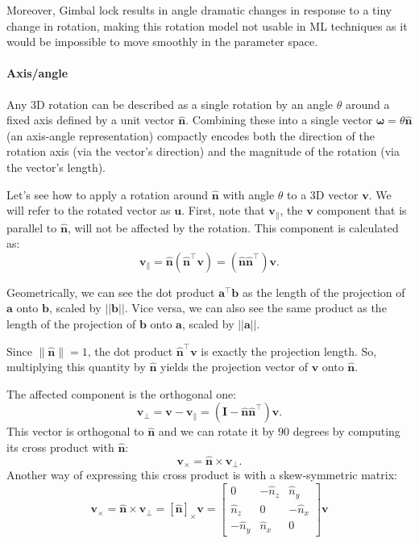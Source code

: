 Moreover, Gimbal lock results in angle dramatic changes in response to a tiny change in rotation, making this rotation model not usable in ML techniques as it would be impossible to move smoothly in the parameter space.

\paragraph{Axis/angle}
Any 3D rotation can be described as a single rotation by an angle $\theta$ around a fixed axis defined by a unit vector $\hat{\mathbf{n}}$.
Combining these into a single vector $\mathbf{\omega} = \theta \hat{\mathbf{n}}$ (an axis-angle representation) compactly encodes both the direction of the rotation axis (via the vector's direction) and the magnitude of the rotation (via the vector's length). 

Let's see how to apply a rotation around $\hat{\mathbf{n}}$ with angle $\theta$ to a 3D vector $\mathbf{v}$.
We will refer to the rotated vector as $\mathbf{u}$.
First, note that $\mathbf{v}_{\parallel}$, the $\mathbf{v}$ component that is parallel to $\hat{\mathbf{n}}$, will not be affected by the rotation.
This component is calculated as:
$$\mathbf{v}_{\parallel}=\hat{\mathbf{n}}(\hat{\mathbf{n}}^{\top}\mathbf{v} )=(\hat{\mathbf{n}}\hat{\mathbf{n}}^{\top})\mathbf{v}.$$

Geometrically, we can see the dot product $\mathbf{a}^{\top}\mathbf{b}$ as the length of the projection of $\mathbf{a}$ onto $\mathbf{b}$, scaled by $||\mathbf{b}||$.
Vice versa, we can also see the same product as the length of the projection of $\mathbf{b}$ onto $\mathbf{a}$, scaled by $||\mathbf{a}||$.

Since $\| \hat{\mathbf{n}} \| =1$, the dot product $\hat{\mathbf{n}}^{\top}\mathbf{v}$ is exactly the projection length.
So, multiplying this quantity by $\hat{\mathbf{n}}$ yields the projection vector of $\mathbf{v}$ onto $\hat{\mathbf{n}}$.

The affected component is the orthogonal one:
$$\mathbf{v}_{\perp}=\mathbf{v}-\mathbf{v}_{\parallel}=(\mathbf{I}-\hat{\mathbf{n}}\hat{\mathbf{n}}^{\top})\mathbf{v}.$$
This vector is orthogonal to $\hat{\mathbf{n}}$ and we can rotate it by $90$ degrees by computing its cross product with $\hat{\mathbf{n}}$:
$$\mathbf{v}_{\times}=\hat{\mathbf{n}}\times \mathbf{v}_{\perp}.$$
Another way of expressing this cross product is with a skew-symmetric matrix:
$$\mathbf{v}_{\times}=\hat{\mathbf{n}}\times \mathbf{v}_{\perp}=[\hat{\mathbf{n}}]_{\times}\mathbf{v}=\begin{bmatrix}
0 & -\hat{n}_{z} & \hat{n}_{y} \\
\hat{n}_{z} & 0 & -\hat{n}_{x} \\
-\hat{n}_{y} & \hat{n}_{x} & 0
\end{bmatrix}\mathbf{v}$$

